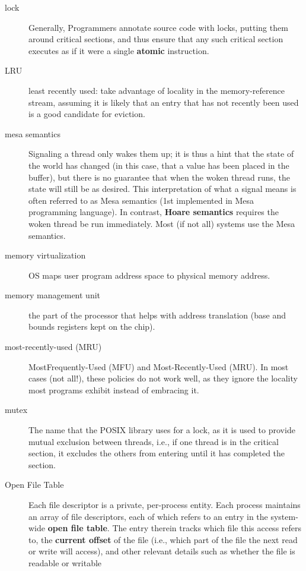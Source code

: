 \begin{description}
\item[lock] Generally, Programmers annotate source code with locks, putting them around critical sections, and thus ensure that any such critical section executes as if it were a single \textbf{atomic} instruction.

\item[LRU] least recently used: take advantage of locality in the memory-reference stream, assuming it is likely that an entry that has not recently been used is a good
candidate for eviction.

\item[mesa semantics] Signaling a thread only wakes them up; it is thus a hint that the state of the world has changed (in this case, that a value has been placed in the buffer), but there is no guarantee that when the woken thread runs, the state will still be as desired. This interpretation of what a signal means is often referred to as Mesa semantics (1st implemented in Mesa programming language). In contrast, \textbf{Hoare semantics} requires the woken thread be run immediately.  Most (if not all) systems use the Mesa semantics.

\item[memory virtualization] OS maps user program address space to physical memory address.

\item[memory management unit] the part of the processor that helps with address translation (base and bounds registers kept on the chip).

\item[most-recently-used (MRU)] MostFrequently-Used (MFU) and Most-Recently-Used (MRU). In most cases (not all!), these policies do not work well, as they ignore the locality most programs exhibit instead of embracing it.

\item[mutex] The name that the POSIX library uses for a lock, as it is used to provide mutual exclusion between threads, i.e., if one thread is in the critical section, it excludes the others from entering until it has completed the section.

\item[Open File Table] Each file descriptor is a private, per-process entity. Each process maintains an array of file descriptors, each of which refers to an entry in the system-wide \textbf{open file table}. The entry therein tracks which file this access refers to, the \textbf{current offset} of the file (i.e., which part of the file the next read or write will access), and other relevant details such as whether the file is readable or writable


\end{description}
